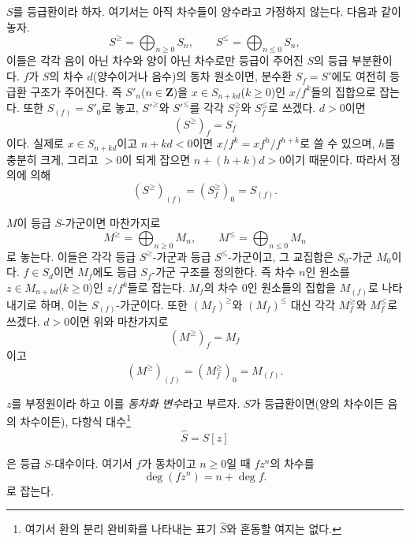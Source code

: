 \begin{env}[8.2.1]
\label{II.8.2.1-ko}
$S$를 등급환이라 하자. 여기서는 아직 차수들이 양수라고 가정하지 않는다.
다음과 같이 놓자.
\begin{equation}
\label{II.8.2.1.1-ko}
  S^{\geq}=\bigoplus_{n\geq0}S_n,
  \qquad
  S^{\leq}=\bigoplus_{n\leq0}S_n,
\tag{8.2.1.1}
\end{equation}
이들은 각각 음이 아닌 차수와 양이 아닌 차수로만 등급이 주어진 $S$의
등급 부분환이다. $f$가 $S$의 차수 $d$(양수이거나 음수)의 동차
원소이면, 분수환 $S_f=S'$에도 여전히 등급환 구조가 주어진다. 즉
$S'_n$($n\in\mathbf{Z}$)을 $x\in S_{n+kd}$($k\geq0$)인 $x/f^k$들의
집합으로 잡는다. 또한 $S_{(f)}=S'_0$로 놓고, $S'^{\geq}$와
$S'^{\leq}$를 각각 $S_f^{\geq}$와 $S_f^{\leq}$로 쓰겠다. $d>0$이면
\begin{equation}
\label{II.8.2.1.2-ko}
  (S^{\geq})_f=S_f
\tag{8.2.1.2}
\end{equation}
이다. 실제로 $x\in S_{n+kd}$이고 $n+kd<0$이면
$x/f^k=xf^h/f^{h+k}$로 쓸 수 있으며, $h$를 충분히 크게, 그리고 $>0$이 되게 잡으면
$n+(h+k)d>0$이기 때문이다. 따라서 정의에 의해
\begin{equation}
\label{II.8.2.1.3-ko}
  (S^{\geq})_{(f)}=(S_f^{\geq})_0=S_{(f)}.
\tag{8.2.1.3}
\end{equation}

$M$이 등급 $S$-가군이면 마찬가지로
\begin{equation}
\label{II.8.2.1.4-ko}
  M^{\geq}=\bigoplus_{n\geq0}M_n,
  \qquad
  M^{\leq}=\bigoplus_{n\leq0}M_n
\tag{8.2.1.4}
\end{equation}
로 놓는다. 이들은 각각 등급 $S^{\geq}$-가군과 등급
$S^{\leq}$-가군이고, 그 교집합은 $S_0$-가군 $M_0$이다. $f\in S_d$이면
$M_f$에도 등급 $S_f$-가군 구조를 정의한다. 즉 차수 $n$인 원소를
$z\in M_{n+kd}$($k\geq0$)인 $z/f^k$들로 잡는다. $M_f$의 차수 $0$인
원소들의 집합을 $M_{(f)}$로 나타내기로 하며, 이는 $S_{(f)}$-가군이다.
또한 $(M_f)^{\geq}$와 $(M_f)^{\leq}$ 대신 각각 $M_f^{\geq}$와
$M_f^{\leq}$로 쓰겠다. $d>0$이면 위와 마찬가지로
\begin{equation}
\label{II.8.2.1.5-ko}
  (M^{\geq})_f=M_f
\tag{8.2.1.5}
\end{equation}
이고
\begin{equation}
\label{II.8.2.1.6-ko}
  (M^{\geq})_{(f)}=(M_f^{\geq})_0=M_{(f)}.
\tag{8.2.1.6}
\end{equation}
\end{env}

\begin{env}[8.2.2]
\label{II.8.2.2-ko}
$z$를 부정원이라 하고 이를 \emph{동차화 변수}라고 부르자. $S$가
등급환이면(양의 차수이든 음의 차수이든), 다항식 대수\footnote{여기서
환의 분리 완비화를 나타내는 표기 $\widehat{S}$와 혼동할 여지는 없다.}
\begin{equation}
\label{II.8.2.2.1-ko}
  \widehat{S}=S[z]
\tag{8.2.2.1}
\end{equation}

은 등급 $S$-대수이다. 여기서 $f$가 동차이고 $n\geq0$일 때
$fz^n$의 차수를
\begin{equation}
\label{II.8.2.2.2-ko}
  \deg(fz^n)=n+\deg f.
\tag{8.2.2.2}
\end{equation}
로 잡는다.
\end{env}


